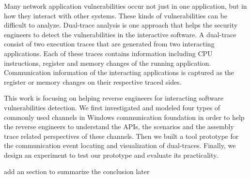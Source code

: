 \label{chapter:introduction}

Many network application vulnerabilities occur not just in one application, but in how they interact with other systems. These kinds of vulnerabilities can be difficult to analyze. Dual-trace analysis is one approach that helps the security engineers to detect the vulnerabilities in the interactive software. A dual-trace consist of two execution traces that are generated from two interacting applications. Each of these traces contains information including CPU instructions, register and memory changes of the running application. Communication information of the interacting applications is captured as the register or memory changes on their respective traced sides. 

This work is focusing on helping reverse engineers for interacting software vulnerabilities detection. We first investigated and modeled four types of commonly used channels in Windows communication foundation in order to help the reverse engineers to understand the APIs, the scenarios and the assembly trace related perspectives of these channels. Then we built a tool prototype for the communication event locating and visualization of dual-traces. Finally, we design an experiment to test our prototype and evaluate its practicality. 

{add an section to summarize the conclusion later}
